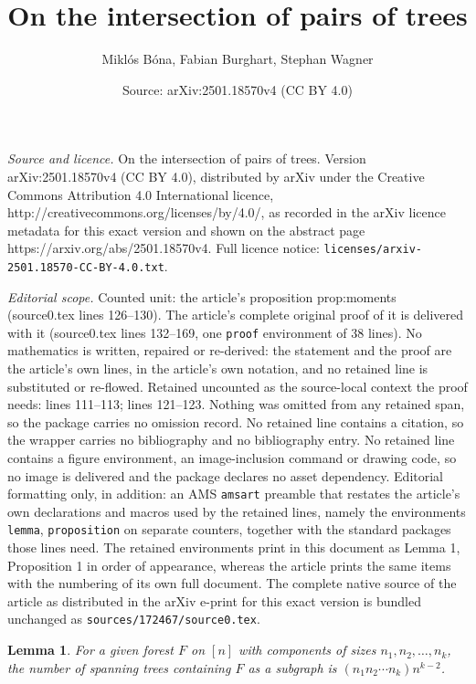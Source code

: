 \documentclass[10pt,a4paper]{amsart}
\title{On the intersection of pairs of trees}
\author{Mikl\'os B\'ona, Fabian Burghart, Stephan Wagner}
\date{Source: arXiv:2501.18570v4 (CC BY 4.0)}
\newtheorem{lemma}{Lemma}
\begin{document}
\maketitle

\noindent\emph{Source and licence.} On the intersection of pairs of trees. Version arXiv:2501.18570v4 (CC BY 4.0), distributed by arXiv under the Creative Commons Attribution 4.0 International licence, http://creativecommons.org/licenses/by/4.0/, as recorded in the arXiv licence metadata for this exact version and shown on the abstract page https://arxiv.org/abs/2501.18570v4. Full licence notice: \texttt{licenses/arxiv-2501.18570-CC-BY-4.0.txt}.\par\smallskip

\noindent\textit{Editorial scope.} Counted unit: the article's proposition prop:moments (source0.tex lines 126--130). The article's complete original proof of it is delivered with it (source0.tex lines 132--169, one \texttt{proof} environment of 38 lines). No mathematics is written, repaired or re-derived: the statement and the proof are the article's own lines, in the article's own notation, and no retained line is substituted or re-flowed.  Retained uncounted as the source-local context the proof needs: lines 111--113; lines 121--123.  Nothing was omitted from any retained span, so the package carries no omission record.  No retained line contains a citation, so the wrapper carries no bibliography and no bibliography entry.  No retained line contains a figure environment, an image-inclusion command or drawing code, so no image is delivered and the package declares no asset dependency.  Editorial formatting only, in addition: an AMS \texttt{amsart} preamble that restates the article's own declarations and macros used by the retained lines, namely the environments \texttt{lemma}, \texttt{proposition} on separate counters, together with the standard packages those lines need.  The retained environments print in this document as Lemma 1, Proposition 1 in order of appearance, whereas the article prints the same items with the numbering of its own full document.  The complete native source of the article as distributed in the arXiv e-print for this exact version is bundled unchanged as \texttt{sources/172467/source0.tex}.
\begin{lemma}\label{lem:given_components}
For a given forest $F$ on $[n]$ with components of sizes $n_1,n_2,\ldots,n_k$, the number of spanning trees containing $F$ as a subgraph is $(n_1n_2 \cdots n_k) n^{k-2}$.
\end{lemma}
\end{document}

